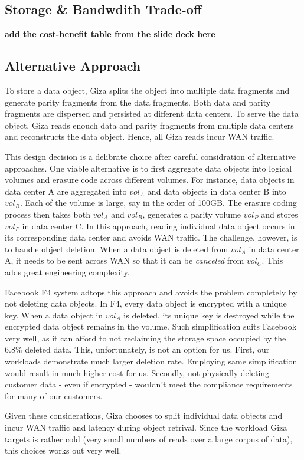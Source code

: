 \subsection{Storage \& Bandwdith Trade-off}

{\bf add the cost-benefit table from the slide deck here}

\subsection{Alternative Approach}

To store a data object, Giza splits the object into multiple data fragments and generate parity fragments from the data fragments. Both data and parity fragments are dispersed and persisted at different data centers. To serve the data object, Giza reads enouch data and parity fragments from multiple data centers and reconstructs the data object. Hence, all Giza reads incur WAN traffic.

This design decision is a delibrate choice after careful considration of alternative approaches. One viable alternative is to first aggregate data objects into logical volumes and erasure code across different volumes. For instance, data objects in data center A are aggregated into $vol_A$ and data objects in data center B into $vol_B$. Each of the volume is large, say in the order of 100GB. The erasure coding process then takes both $vol_A$ and $vol_B$,  generates a parity volume $vol_P$ and stores $vol_P$ in data center C. In this approach, reading individual data object occurs in its corresponding data center and avoids WAN traffic. The challenge, however, is to handle object deletion. When a data object is deleted from $vol_A$ in data center A, it needs to be sent across WAN so that it can be {\em canceled} from $vol_C$. This adds great engineering complexity.

Facebook F4 system adtops this approach and avoids the problem completely by not deleting data objects. In F4, every data object is encrypted with a unique key. When a data object in $vol_A$ is deleted, its unique key is destroyed while the encrypted data object remains in the volume. Such simplification suits Facebook very well, as it can afford to not reclaiming the storage space occupied by the  $6.8\%$ deleted data. This, unfortunately, is not an option for us. First, our workloads demonstrate much larger deletion rate. Employing same simplification would result in much higher cost for us. Secondly, not physically deleting customer data - even if encrypted - wouldn't meet the compliance requirements for many of our customers.

Given these considerations, Giza chooses to split individual data objects and incur WAN traffic and latency during object retrival. Since the workload Giza targets is rather cold (very small numbers of reads over a large corpus of data), this choices works out very well.

